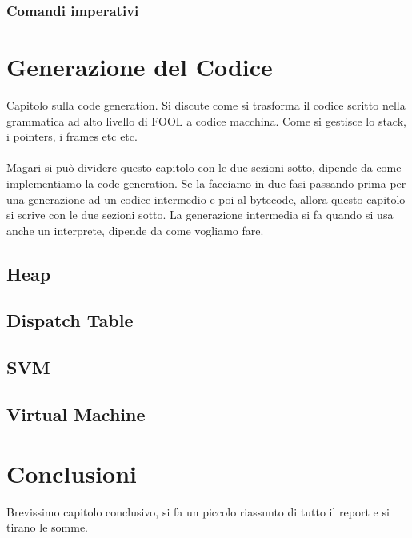 \documentclass{scrreprt}
\begin{document}
\subsection{Comandi imperativi}

\chapter{Generazione del Codice}
Capitolo sulla code generation. Si discute come si trasforma il codice scritto nella grammatica
ad alto livello di FOOL a codice macchina. Come si gestisce lo stack, i pointers, i frames etc etc.\\
\\
Magari si può dividere questo capitolo con le due sezioni sotto, dipende da come implementiamo la code 
generation. Se la facciamo in due fasi passando prima per una generazione ad un codice intermedio e 
poi al bytecode, allora questo capitolo si scrive con le due sezioni sotto.
La generazione intermedia si fa quando si usa anche un interprete, dipende da come vogliamo fare.

\section{Heap}
\section{Dispatch Table}
\section{SVM}
\section{Virtual Machine}

\chapter{Conclusioni}
Brevissimo capitolo conclusivo, si fa un piccolo riassunto di tutto il report e si tirano le somme.
\end{document}
